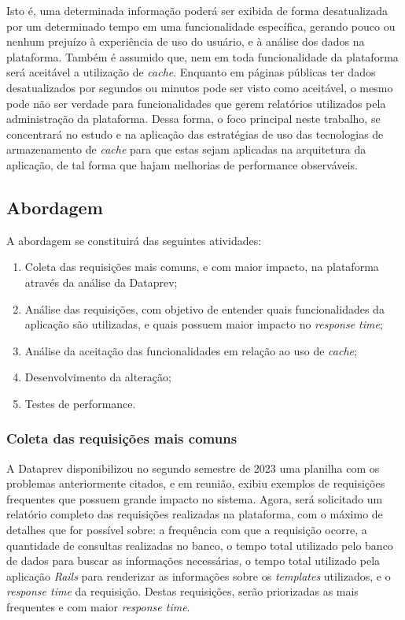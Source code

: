 Isto é, uma determinada informação poderá ser exibida de forma desatualizada por um determinado tempo em uma funcionalidade específica, gerando pouco ou nenhum prejuízo à experiência de uso do usuário, e à análise dos dados na plataforma. Também é assumido que, nem em toda funcionalidade da plataforma será aceitável a utilização de \textit{cache}. Enquanto em páginas públicas ter dados desatualizados por segundos ou minutos pode ser visto como aceitável, o mesmo pode não ser verdade para funcionalidades que gerem relatórios utilizados pela administração da plataforma. Dessa forma, o foco principal neste trabalho, se concentrará no estudo e na aplicação das estratégias de uso das tecnologias de armazenamento de \textit{cache} para que estas sejam aplicadas na arquitetura da aplicação, de tal forma que hajam melhorias de performance observáveis.

\subsection{Abordagem}

A abordagem se constituirá das seguintes atividades:

\begin{enumerate}
    \item Coleta das requisições mais comuns, e com maior impacto, na plataforma através da análise da Dataprev;\label{enum:coleta_das_requisicoes}
    \item Análise das requisições, com objetivo de entender quais funcionalidades da aplicação são utilizadas, e quais possuem maior impacto no \textit{response time};
    \item Análise da aceitação das funcionalidades em relação ao uso de \textit{cache};
    \item Desenvolvimento da alteração;
    \item Testes de performance.
\end{enumerate}

\subsubsection{Coleta das requisições mais comuns}

A Dataprev disponibilizou no segundo semestre de 2023 uma planilha com os problemas anteriormente citados, e em reunião, exibiu exemplos de requisições frequentes que possuem grande impacto no sistema. Agora, será solicitado um relatório completo das requisições realizadas na plataforma, com o máximo de detalhes que for possível sobre: a frequência com que a requisição ocorre, a quantidade de consultas realizadas no banco, o tempo total utilizado pelo banco de dados para buscar as informações necessárias, o tempo total utilizado pela aplicação \textit{Rails} para renderizar as informações sobre os \textit{templates} utilizados, e o \textit{response time} da requisição. Destas requisições, serão priorizadas as mais frequentes e com maior \textit{response time}.

